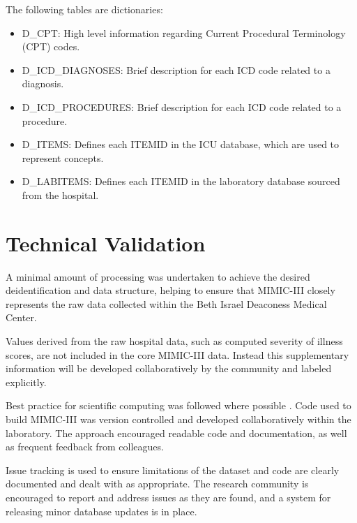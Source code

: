 \documentclass[english]{article}
\begin{document}
The following tables are dictionaries:

\begin{itemize}
  \item D\_CPT: High level information regarding Current Procedural Terminology (CPT) codes.
  \item D\_ICD\_DIAGNOSES: Brief description for each ICD code related to a diagnosis.
  \item D\_ICD\_PROCEDURES: Brief description for each ICD code related to a procedure.
  \item D\_ITEMS: Defines each ITEMID in the ICU database, which are used to represent concepts.
  \item D\_LABITEMS: Defines each ITEMID in the laboratory database sourced from the hospital.
\end{itemize}


\section*{Technical Validation}


A minimal amount of processing was undertaken to achieve the desired deidentification and data structure, helping to ensure that MIMIC-III closely represents the raw data collected within the Beth Israel Deaconess Medical Center.

Values derived from the raw hospital data, such as computed severity of illness scores, are not included in the core MIMIC-III data. Instead this supplementary information will be developed collaboratively by the community and labeled explicitly.

Best practice for scientific computing was followed where possible \cite{cite3}. Code used to build MIMIC-III was version controlled and developed collaboratively within the laboratory. The approach encouraged readable code and documentation, as well as frequent feedback from colleagues.

Issue tracking is used to ensure limitations of the dataset and code are clearly documented and dealt with as appropriate. The research community is encouraged to report and address issues as they are found, and a system for releasing minor database updates is in place.
\end{document}
